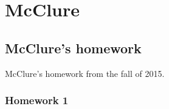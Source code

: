 \chapter{McClure}
\section{McClure's homework}
McClure's homework from the fall of 2015.
\subsection{Homework 1}

